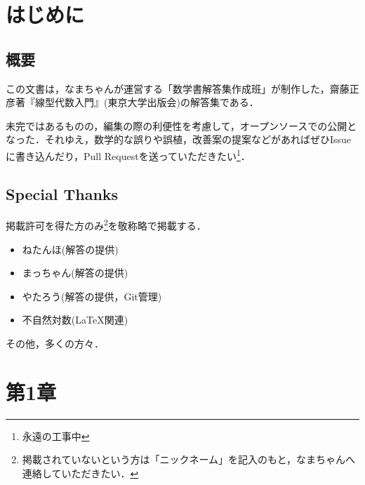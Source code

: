 \documentclass[uplatex,dvipdfmx,a4paper,11pt,fleqn]{jsarticle}
\begin{document}


\thispagestyle{empty}

\newpage
{}
\pagecolor{white}

\begin{multicols}{3}
\tableofcontents
\end{multicols}

\newpage 

\section*{はじめに}

\subsection*{概要}

この文書は，なまちゃんが運営する「数学書解答集作成班」が制作した，齋藤正彦著『線型代数入門』(東京大学出版会)の解答集である．

未完ではあるものの，編集の際の利便性を考慮して，オープンソースでの公開となった．それゆえ，数学的な誤りや誤植，改善案の提案などがあればぜひIssueに書き込んだり，Pull Requestを送っていただきたい\footnote{永遠の工事中}．


\subsection*{Special Thanks}

掲載許可を得た方のみ\footnote{掲載されていないという方は「ニックネーム」を記入のもと，なまちゃんへ連絡していただきたい．}を敬称略で掲載する．
\begin{itemize}
    \item ねたんほ(解答の提供)
    \item まっちゃん(解答の提供)
    \item やたろう(解答の提供，Git管理)
    \item 不自然対数(\LaTeX 関連)
\end{itemize}

その他，多くの方々．

\newpage 
\section*{第1章}
\end{document}
